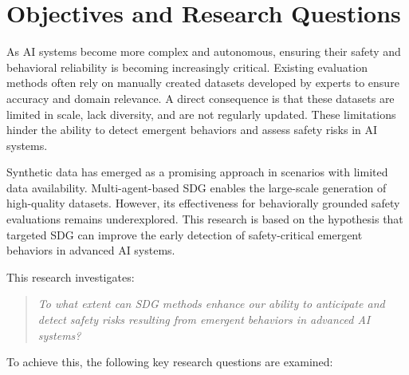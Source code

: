 \documentclass[12pt,a4paper]{article}
\begin{document}
\section{Objectives and Research Questions}
As AI systems become more complex and autonomous, ensuring their safety and behavioral reliability is becoming increasingly critical. Existing evaluation methods often rely on manually created datasets developed by experts to ensure accuracy and domain relevance. A direct consequence is that these datasets are limited in scale, lack diversity, and are not regularly updated. These limitations hinder the ability to detect emergent behaviors and assess safety risks in AI systems.

Synthetic data has emerged as a promising approach in scenarios with limited data availability. Multi-agent-based SDG enables the large-scale generation of high-quality datasets. However, its effectiveness for behaviorally grounded safety evaluations remains underexplored. This research is based on the hypothesis that targeted SDG can improve the early detection of safety-critical emergent behaviors in advanced AI systems.

This research investigates: 

\begin{quote}
\textit{To what extent can SDG methods enhance our ability to anticipate and detect safety risks resulting from emergent behaviors in advanced AI systems?}
\end{quote}
To achieve this, the following key research questions are examined:
\end{document}
